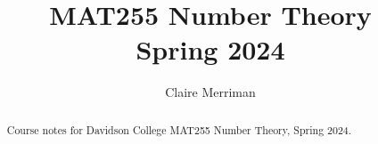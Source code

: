 \documentclass{xourse}
\title{MAT255 Number Theory\\Spring 2024}
\author{Claire Merriman}
\begin{document}
  
\begin{abstract} %
Course notes for Davidson College MAT255 Number Theory, Spring 2024.
\end{abstract}  
\maketitle  
 
\chapterstyle
\sectionstyle  

\chapterstyle










\end{document}

